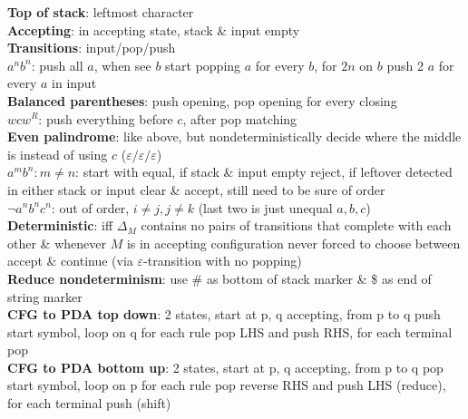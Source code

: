 \documentclass[a4paper]{article}
\begin{document}
\begin{multicols}{2}
        \textbf{Top of stack}: leftmost character\\
        \textbf{Accepting}: in accepting state, stack \& input empty\\
        \textbf{Transitions}: input/pop/push\\
        \boldmath$a^n b^n$\unboldmath: push all $a$, when see $b$ start popping $a$ for every $b$, for $2n$ on $b$ push 2 $a$ for every $a$ in input\\
        \textbf{Balanced parentheses}: push opening, pop opening for every closing\\
        \boldmath$wc w^R$\unboldmath: push everything before $c$, after pop matching\\
        \textbf{Even palindrome}: like above, but nondeterministically decide where the middle is instead of using $c$ ($\varepsilon/\varepsilon/\varepsilon$)\\
        \boldmath$a^m b^n: m \neq n$\unboldmath: start with equal, if stack \& input empty reject, if leftover detected in either stack or input clear \& accept, still need to be sure of order\\
        \boldmath$\neg a^n b^n c^n$\unboldmath: out of order, $i \neq j, j \neq k$ (last two is just unequal $a, b, c$)\\
        \textbf{Deterministic}: iff $\Delta_M$ contains no pairs of transitions that complete with each other \& whenever $M$ is in accepting configuration never forced to choose between accept \& continue (via $\varepsilon$-transition with no popping)\\
        \textbf{Reduce nondeterminism}: use \# as bottom of stack marker \& \$ as end of string marker\\
        \textbf{CFG to PDA top down}: 2 states, start at p, q accepting, from p to q push start symbol, loop on q for each rule pop LHS and push RHS, for each terminal pop\\
        \textbf{CFG to PDA bottom up}: 2 states, start at p, q accepting, from p to q pop start symbol, loop on p for each rule pop reverse RHS and push LHS (reduce), for each terminal push (shift)\\
    \end{multicols}
    
\end{document}

